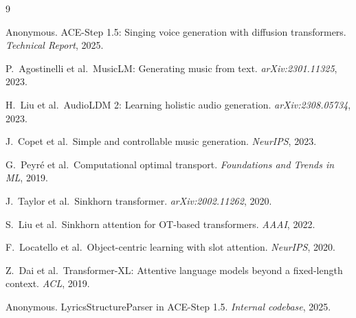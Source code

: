 \documentclass[11pt,a4paper]{article}
\begin{document}

\begin{thebibliography}{9}

Anonymous. ACE-Step 1.5: Singing voice generation with diffusion transformers.
\textit{Technical Report}, 2025.

P.~Agostinelli et al.\ MusicLM: Generating music from text.
\textit{arXiv:2301.11325}, 2023.

H.~Liu et al.\ AudioLDM 2: Learning holistic audio generation.
\textit{arXiv:2308.05734}, 2023.

J.~Copet et al.\ Simple and controllable music generation.
\textit{NeurIPS}, 2023.

G.~Peyr{\'e} et al.\ Computational optimal transport.
\textit{Foundations and Trends in ML}, 2019.

J.~Taylor et al.\ Sinkhorn transformer.
\textit{arXiv:2002.11262}, 2020.

S.~Liu et al.\ Sinkhorn attention for OT-based transformers.
\textit{AAAI}, 2022.

F.~Locatello et al.\ Object-centric learning with slot attention.
\textit{NeurIPS}, 2020.

Z.~Dai et al.\ Transformer-XL: Attentive language models beyond a fixed-length context.
\textit{ACL}, 2019.

Anonymous. LyricsStructureParser in ACE-Step 1.5.
\textit{Internal codebase}, 2025.

\end{thebibliography}
\end{document}
